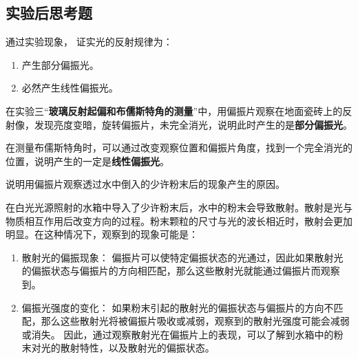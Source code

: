 \documentclass[dvipsnames, svgnames,a4paper,11pt]{article}
\begin{document}
	









			
			
\subsection{实验后思考题}

\begin{question}
	通过实验现象， 证实光的反射规律为：
	\begin{enumerate}
		\item 产生部分偏振光。
		\item 必然产生线性偏振光。
	\end{enumerate}

\end{question}

	在实验三“\textbf{玻璃反射起偏和布儒斯特角的测量}”中，用偏振片观察在地面瓷砖上的反射像，发现亮度变暗，旋转偏振片，未完全消光，说明此时产生的是\textbf{部分偏振光}。

	在测量布儒斯特角时，可以通过改变观察位置和偏振片角度，找到一个完全消光的位置，说明产生的一定是\textbf{线性偏振光}。





\begin{question}
	说明用偏振片观察透过水中倒入的少许粉末后的现象产生的原因。
\end{question}
	


在白光光源照射的水箱中导入了少许粉末后，水中的粉末会导致散射。散射是光与物质相互作用后改变方向的过程。粉末颗粒的尺寸与光的波长相近时，散射会更加明显。在这种情况下，观察到的现象可能是：

	\begin{enumerate}
		\item 散射光的偏振现象： 偏振片可以使特定偏振状态的光通过，因此如果散射光的偏振状态与偏振片的方向相匹配，那么这些散射光就能通过偏振片而观察到。
		\item 偏振光强度的变化： 如果粉末引起的散射光的偏振状态与偏振片的方向不匹配，那么这些散射光将被偏振片吸收或减弱，观察到的散射光强度可能会减弱或消失。
		因此，通过观察散射光在偏振片上的表现，可以了解到水箱中的粉末对光的散射特性，以及散射光的偏振状态。
	\end{enumerate}
\end{document}

